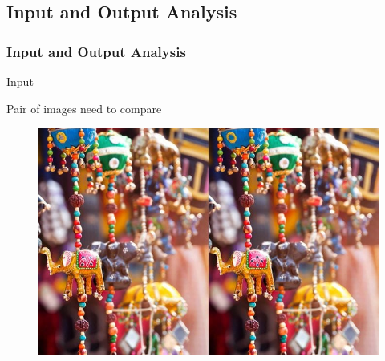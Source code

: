 \documentclass[13.5pt,aspecratio=169, xcolor=dvipsnames]{beamer}
\begin{document}
    \subsection{Input and Output Analysis}

    \begin{frame}
    \onehalfspacing
        \frametitle{Input and Output Analysis}
            \begin{block}{\begin{center}Input\end{center}}
                \vspace{1em}
                \begin{center}Pair of images need to compare \hphantom{with bounding boxes to indicate
                    areas of distinction
                    }\end{center}
                
                \begin{figure}
                    \centering
                    \includegraphics[scale=0.3]{Example/07_full.jpg}
                \end{figure}
            \end{block}
    \end{frame}
    
\end{document}

